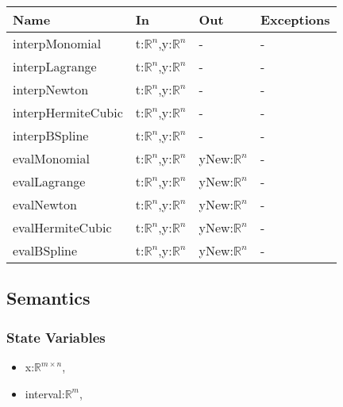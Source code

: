 \documentclass[12pt, titlepage]{article}
\begin{document}
\begin{center}
\begin{tabular}{p{4cm} p{4cm} p{4cm} p{3cm}}
\hline
\textbf{Name} & \textbf{In} & \textbf{Out} & \textbf{Exceptions} \\
\hline
interpMonomial & t:$\mathbb{R}^n$,y:$\mathbb{R}^n$  & - & - \\
interpLagrange & t:$\mathbb{R}^n$,y:$\mathbb{R}^n$ & - & - \\
interpNewton & t:$\mathbb{R}^n$,y:$\mathbb{R}^n$ & - & - \\
interpHermiteCubic & t:$\mathbb{R}^n$,y:$\mathbb{R}^n$ & - & 
- \\
interpBSpline & t:$\mathbb{R}^n$,y:$\mathbb{R}^n$ & - & - \\

evalMonomial & t:$\mathbb{R}^n$,y:$\mathbb{R}^n$ & yNew:$\mathbb{R}^n$  & - \\
evalLagrange & t:$\mathbb{R}^n$,y:$\mathbb{R}^n$ & yNew:$\mathbb{R}^n$ & - \\
evalNewton & t:$\mathbb{R}^n$,y:$\mathbb{R}^n$ & yNew:$\mathbb{R}^n$ & - \\
evalHermiteCubic & t:$\mathbb{R}^n$,y:$\mathbb{R}^n$ & yNew:$\mathbb{R}^n$ & - 
\\
evalBSpline & t:$\mathbb{R}^n$,y:$\mathbb{R}^n$ & yNew:$\mathbb{R}^n$ & - \\
\hline
\end{tabular}
\end{center}


\subsection{Semantics}

\subsubsection{State Variables}
\begin{itemize}
	\item x:$\mathbb{R}^{m \times n}$, \\
	
	\item interval:$\mathbb{R}^m$,  \\
	
\end{itemize}
\end{document}
